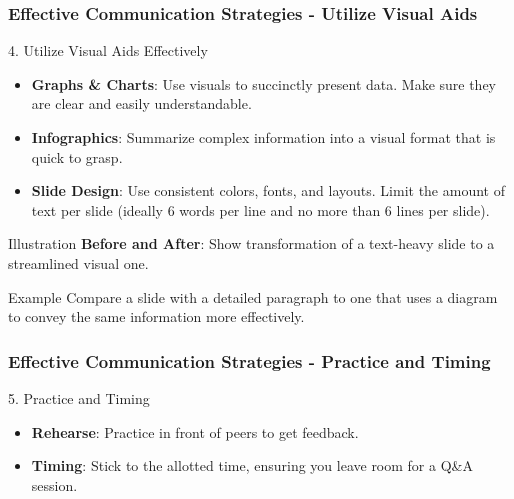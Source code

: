 \documentclass[aspectratio=169]{beamer}
\begin{document}
\begin{frame}[fragile]
    \frametitle{Effective Communication Strategies - Utilize Visual Aids}
    \begin{block}{4. Utilize Visual Aids Effectively}
        \begin{itemize}
            \item \textbf{Graphs \& Charts}: Use visuals to succinctly present data. Make sure they are clear and easily understandable.
            \item \textbf{Infographics}: Summarize complex information into a visual format that is quick to grasp.
            \item \textbf{Slide Design}: Use consistent colors, fonts, and layouts. Limit the amount of text per slide (ideally 6 words per line and no more than 6 lines per slide).
        \end{itemize}
    \end{block}
    
    \begin{block}{Illustration}
        \textbf{Before and After}: Show transformation of a text-heavy slide to a streamlined visual one.
    \end{block}

    \begin{block}{Example}
        Compare a slide with a detailed paragraph to one that uses a diagram to convey the same information more effectively.
    \end{block}
\end{frame}

\begin{frame}[fragile]
    \frametitle{Effective Communication Strategies - Practice and Timing}
    \begin{block}{5. Practice and Timing}
        \begin{itemize}
            \item \textbf{Rehearse}: Practice in front of peers to get feedback.
            \item \textbf{Timing}: Stick to the allotted time, ensuring you leave room for a Q\&A session.
        \end{itemize}
    \end{block}
\end{frame}
\end{document}
